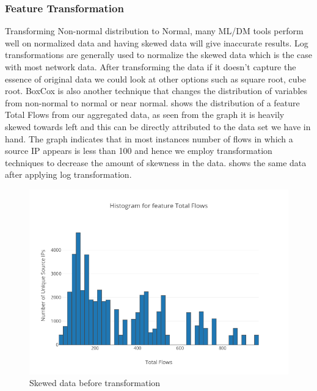 \subsubsection{Feature Transformation} 
Transforming Non-normal distribution to Normal, many ML/DM tools perform well on normalized data and having skewed data will give inaccurate results. Log transformations are generally used to normalize the skewed data which is the case with most network data. After transforming the data if it doesn't capture the essence of original data we could look at other options such as square root, cube root. BoxCox is also another technique that changes the distribution of variables from non-normal to normal or near normal.  shows the distribution of a feature Total Flows from our aggregated data, as seen from the graph it is heavily skewed towards left and this can be directly attributed to the data set we have in hand. The graph indicates that in most instances number of flows in which a source IP appears is less than 100 and hence we employ transformation techniques to decrease the amount of skewness in the data.   shows the same data after applying log transformation. 

\begin{figure}[t]
	\centerline{\includegraphics[scale = 0.9]{feature.png}}
	\caption{Skewed data before transformation}%
\end{figure}

